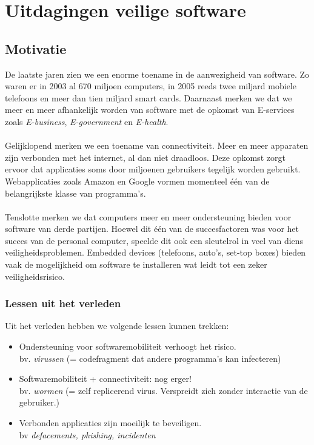 \documentclass[../main.tex]{subfiles}
\begin{document}
\chapter{Uitdagingen veilige software}

\section{Motivatie}
De laatste jaren zien we een enorme toename in de aanwezigheid van software. Zo waren er in 2003 al 670 miljoen computers, in 2005 reeds twee miljard mobiele telefoons en meer dan tien miljard smart cards. Daarnaast merken we dat we meer en meer afhankelijk worden van software met de opkomst van E-services zoals \textit{E-business}, \textit{E-government} en \textit{E-health}. 
\\\\
Gelijklopend merken we een toename van connectiviteit. Meer en meer apparaten zijn verbonden met het internet, al dan niet draadloos. Deze opkomst zorgt ervoor dat applicaties soms door miljoenen gebruikers tegelijk worden gebruikt. Webapplicaties zoals Amazon en Google vormen momenteel \'e\'en van de belangrijkste klasse van programma's.
\\\\
Tenslotte merken we dat computers meer en meer ondersteuning bieden voor software van derde partijen. Hoewel dit \'e\'en van de succesfactoren was voor het succes van de personal computer, speelde dit ook een sleutelrol in veel van diens veiligheidsproblemen. Embedded devices (telefoons, auto's, set-top boxes) bieden vaak de mogelijkheid om software te installeren wat leidt tot een zeker veiligheidsrisico.

\subsection{Lessen uit het verleden}
Uit het verleden hebben we volgende lessen kunnen trekken:
\begin{itemize}
	\item Ondersteuning voor softwaremobiliteit verhoogt het risico. \\ bv. \textit{virussen} (= codefragment dat andere programma's kan infecteren)
	\item Softwaremobiliteit + connectiviteit: nog erger! \\ bv. \textit{wormen} (= zelf replicerend virus. Verspreidt zich zonder interactie van de gebruiker.)
	\item Verbonden applicaties zijn moeilijk te beveiligen. \\ bv \textit{defacements, phishing, incidenten}
\end{itemize}
\end{document}
